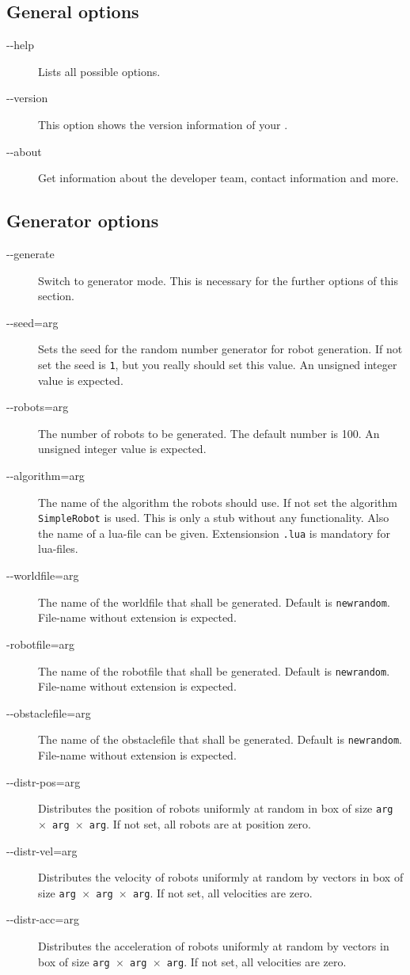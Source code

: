 \documentclass[a4paper,halfparskip,11pt,twoside]{scrartcl}
\begin{document}
\subsection{General options}
\begin{description}
	\item [-{}-help] Lists all possible options.
	\item [-{}-version] This option shows the version information of your \RSS.
	\item [-{}-about] Get information about the developer team, contact information and more.
\end{description}

\subsection{Generator options}
\begin{description}
	\item [-{}-generate] Switch to generator mode. This is necessary for the further options of this section.
	\item [-{}-seed=arg] Sets the seed for the random number generator for robot generation. If not set the seed is {\tt 1}, but you really should set this value. An unsigned integer value is expected.
	\item [-{}-robots=arg] The number of robots to be generated. The default number is 100. An unsigned integer value is expected.
	\item [-{}-algorithm=arg] The name of the algorithm the robots should use. If not set the algorithm {\tt SimpleRobot} is used. This is only a stub without any functionality. Also the name of a lua-file can be given. Extensionsion {\tt .lua} is mandatory for lua-files.
	\item [-{}-worldfile=arg] The name of the worldfile that shall be generated. Default is {\tt newrandom}. File-name without extension is expected.
	\item [-{}robotfile=arg] The name of the robotfile that shall be generated. Default is {\tt newrandom}. File-name without extension is expected.
	\item [-{}-obstaclefile=arg] The name of the obstaclefile that shall be generated. Default is {\tt newrandom}. File-name without extension is expected.
	\item [-{}-distr-pos=arg] Distributes the position of robots uniformly at random in box of size {\tt arg $\times$ arg $\times$ arg}.
 If not set, all robots are at position zero.
	\item [-{}-distr-vel=arg] Distributes the velocity of robots uniformly at random by vectors in box of size {\tt arg $\times$ arg $\times$ arg}.
 If not set, all velocities are zero.
	\item [-{}-distr-acc=arg] Distributes the acceleration of robots uniformly at random by vectors in box of size {\tt arg $\times$ arg $\times$ arg}.
 If not set, all velocities are zero.
\end{description}
\end{document}
